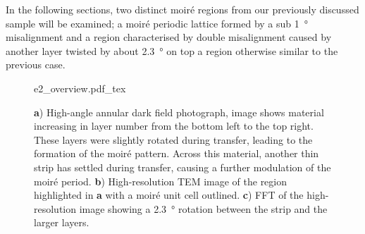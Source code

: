 
In the following sections, two distinct moiré regions from our previously discussed sample will be examined; a moiré periodic lattice formed by a sub \SI{1}{\degree} misalignment and a region characterised by double misalignment caused by another layer twisted by about \SI{2.3}{\degree} on top a region otherwise similar to the previous case.
\begin{figure}[h]
    \centering
    \def\svgwidth{.95\linewidth}
    {e2_overview.pdf_tex}
    \caption{\textbf{a}) High-angle annular dark field photograph, image shows material increasing in layer number from the bottom left to the top right. These layers were slightly rotated during transfer, leading to the formation of the moiré pattern. Across this material, another thin strip has settled during transfer, causing a further modulation of the moiré period. \textbf{b}) High-resolution TEM image of the region highlighted in \textbf{a} with a moiré unit cell outlined. \textbf{c}) FFT of the high-resolution image showing a \SI{2.3}{\degree} rotation between the strip and the larger layers.}
    \label{fig:dub_moire}
\end{figure}


